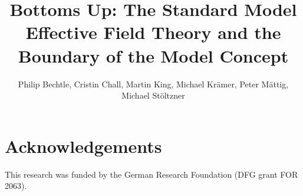 \documentclass[letterpaper]{article}
\title{Bottoms Up: The Standard Model Effective Field Theory and the Boundary of the Model Concept}
\author{Philip Bechtle, Cristin Chall, Martin King, Michael Kr{\"a}mer, Peter M{\"a}ttig, \\ Michael St{\"o}ltzner}
\date{}
\begin{document}
\maketitle
















\section{Acknowledgements}
This research was funded by the German Research Foundation (DFG grant FOR 2063). 



\end{document}
